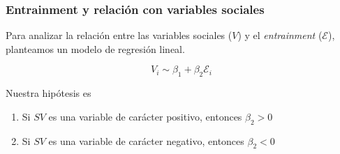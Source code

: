 \begin{frame}
\frametitle{Entrainment y relación con variables sociales}

  Para analizar la relación entre las variables sociales ($V$) y el \emph{entrainment} ($\mathcal{E}$), planteamos un modelo de regresión lineal.

    \begin{equation}
      V_i \sim \beta_1 + \beta_2 \mathcal{E}_i
    \end{equation}

  Nuestra hipótesis es

  \begin{enumerate}
    \item Si $SV$ es una variable de carácter positivo, entonces $\beta_2 > 0$
    \item Si $SV$ es una variable de carácter negativo, entonces $\beta_2 < 0$
  \end{enumerate}
\end{frame}
